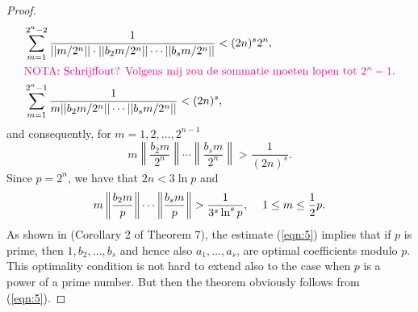 \documentclass[a4paper, 12pt]{article}
\begin{document}
\begin{proof}
\begin{align*}
&\sum_{m=1}^{2^n-2}\frac{1}{||m/2^n||\cdot||b_2m/2^n|| \cdots ||b_sm/2^n||} < (2n)^s2^n,\\
&\mbox{\comm{NOTA: Schrijffout? Volgens mij zou de sommatie moeten lopen tot $2^n-1$.}} \\
&\sum_{m=1}^{2^n-1}\frac{1}{m||b_2m/2^n|| \cdots ||b_sm/2^n||} < (2n)^s,
\end{align*}
and consequently, for $m=1,2,\dots,2^{n-1}$
\begin{equation*}
m\left\|\frac{b_2m}{2^n}\right\| \cdots \left\|\frac{b_sm}{2^n}\right\|>\frac{1}{(2n)^s}.
\end{equation*}
Since $p=2^n$, we have that $2n<3\ln{p}$ and
\begin{equation}
\label{eqn:5}
m\left\|\frac{b_2m}{p}\right\| \cdots \left\|\frac{b_sm}{p}\right\|>\frac{1}{3^s\ln^s{p}}, \mbox{\hspace{12pt}}1\le m\le\frac{1}{2}p.
\end{equation}
As shown in \cite{korobov1967} (Corollary 2 of Theorem 7), the estimate (\ref{eqn:5}) implies that if $p$ is prime, then $1,b_2,\dots,b_s$ and hence also $a_1,\dots,a_s$, are optimal coefficients modulo $p$. This optimality condition is not hard to extend also to the case when $p$ is a power of a prime number. But then the theorem obviously follows from (\ref{eqn:5}).
\end{proof}


\end{document}
